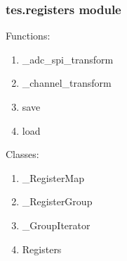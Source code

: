 \documentclass[letterpaper,10pt,english]{sphinxmanual}
\begin{document}
\subsubsection{tes.registers module}
\label{\detokenize{tes:module-tes.registers}}\label{\detokenize{tes:tes-registers-module}}
\sphinxAtStartPar
Functions:
\begin{enumerate}
%
\item {} 
\sphinxAtStartPar
\_adc\_spi\_transform

\item {} 
\sphinxAtStartPar
\_channel\_transform

\item {} 
\sphinxAtStartPar
save

\item {} 
\sphinxAtStartPar
load

\end{enumerate}

\sphinxAtStartPar
Classes:
\begin{enumerate}
%
\item {} 
\sphinxAtStartPar
\_RegisterMap

\item {} 
\sphinxAtStartPar
\_RegisterGroup

\item {} 
\sphinxAtStartPar
\_GroupIterator

\item {} 
\sphinxAtStartPar
Registers

\end{enumerate}
\end{document}

